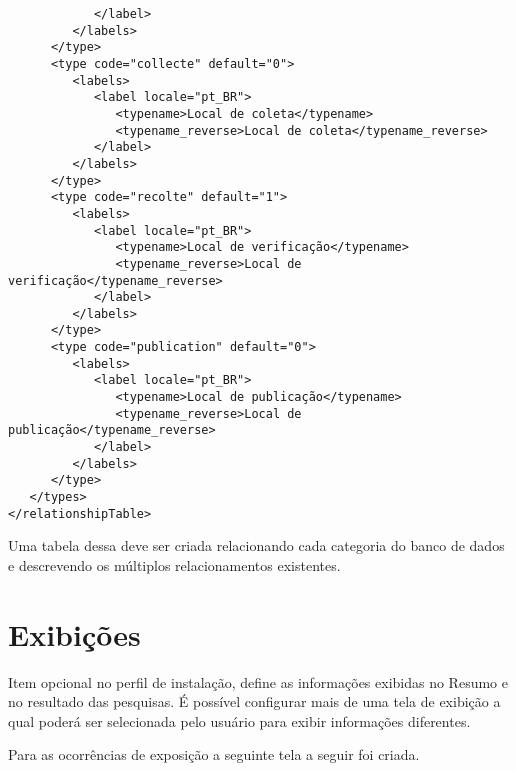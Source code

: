 \begin{lstlisting}
			</label>
		 </labels>
	  </type>
	  <type code="collecte" default="0">
		 <labels>
		    <label locale="pt_BR">
			   <typename>Local de coleta</typename>
			   <typename_reverse>Local de coleta</typename_reverse>
			</label>
		 </labels>
	  </type>
	  <type code="recolte" default="1">
		 <labels>
			<label locale="pt_BR">
			   <typename>Local de verificação</typename>
			   <typename_reverse>Local de verificação</typename_reverse>
			</label>
		 </labels>
	  </type>
	  <type code="publication" default="0">
		 <labels>
			<label locale="pt_BR">
			   <typename>Local de publicação</typename>
			   <typename_reverse>Local de publicação</typename_reverse>
			</label>
		 </labels>
	  </type>
   </types>
</relationshipTable>
\end{lstlisting}

Uma tabela dessa deve ser criada relacionando cada categoria do banco de dados e descrevendo os múltiplos relacionamentos existentes.

\section{Exibições}

Item opcional no perfil de instalação, define as informações exibidas no Resumo e no resultado das pesquisas. É possível configurar mais de uma tela de exibição a qual poderá ser selecionada pelo usuário para exibir informações diferentes.

Para as ocorrências de exposição a seguinte tela a seguir foi criada.

